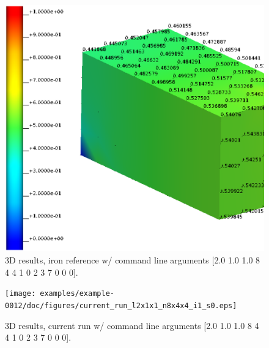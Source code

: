 \begin{figure}[h!]
    \centering 
    \includegraphics[width=0.9\columnwidth]{examples/example-0012/doc/figures/iron_reference_3D.eps} 
    \caption{3D results, iron reference w/ command line arguments [2.0 1.0 1.0 8 4 4 1 0 2 3 7 0 0 0].}
    \label{example-0012-iron-3D-reference-fig}
\end{figure}
%
\begin{figure}[h!]
    \centering 
    \texttt{[image: examples/example-0012/doc/figures/current\_run\_l2x1x1\_n8x4x4\_i1\_s0.eps]} 
    \caption{3D results, current run w/ command line arguments [2.0 1.0 1.0 8 4 4 1 0 2 3 7 0 0 0].}
    \label{example-0012-current-run-3D-fig}
\end{figure}
%
